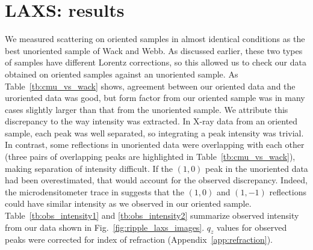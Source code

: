 \section{LAXS: results}\label{sec:LAXS_results}
We measured scattering on oriented samples in almost identical conditions as the
best unoriented sample of Wack and Webb. As discussed earlier,
these two types of samples have different Lorentz corrections, so 
this allowed us to check our data obtained on 
oriented samples against an unoriented sample.
As Table~\ref{tb:cmu_vs_wack} shows, agreement between our oriented data
and the uroriented data was good, but form factor from our oriented
sample was in many cases slightly larger than that from the unoriented sample.
We attribute this discrepancy to the way intensity was extracted. 
In X-ray data from an oriented sample, each peak
was well separated, so integrating a peak intensity was trivial.
In contrast, some reflections in unoriented data were overlapping with
each other (three pairs of overlapping peaks are highlighted in 
Table~\ref{tb:cmu_vs_wack}), 
making separation of intensity difficult. If the $(1,0)$ peak in the unoriented 
data had been overestimated, that would account for the observed discrepancy.
Indeed, the microdensitometer trace in \cite{ref:Wack89} suggests that 
the $(1,0)$ and $(1,-1)$ reflections could have similar intensity as we observed
in our oriented sample. 
Table~\ref{tb:obs_intensity1} and \ref{tb:obs_intensity2} summarize observed 
intensity from our data shown in Fig.~\ref{fig:ripple_laxs_images}. $q_z$ values 
for observed peaks were corrected for index of refraction (Appendix~\ref{app:refraction}).

